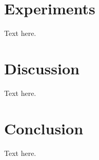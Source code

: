 \documentclass{article}
\begin{document}
\section{Experiments}
Text here.

\section{Discussion}
Text here.

\section{Conclusion}
Text here.



\end{document}
